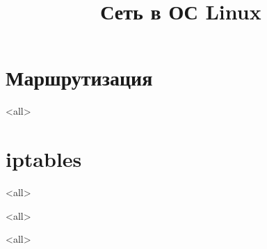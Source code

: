 

\title{Сеть в ОС Linux}








\begin{frame}
	\frametitle{}
	\titlepage
	\vspace{-0.5cm}
	\begin{center}
	\end{center}
\end{frame}



\section{Маршрутизация}
\mode<all>{}

\section{iptables}
\mode<all>{}

\mode<all>{}

\mode<all>

